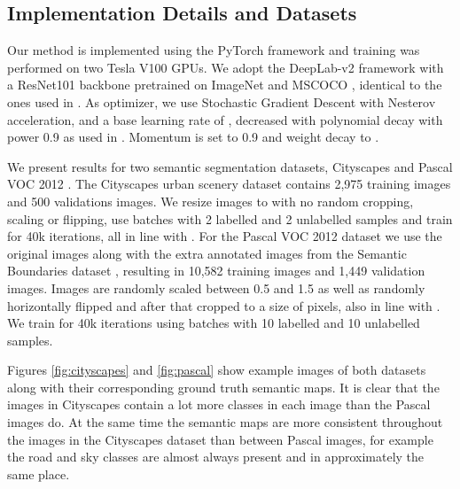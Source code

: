 \documentclass[10pt,twocolumn,letterpaper]{article}
\begin{document}
\subsection{Implementation Details and Datasets}
Our method is implemented using the PyTorch framework and training was performed on two Tesla V100 GPUs. We adopt the DeepLab-v2 framework \cite{DeepLabv2} with a ResNet101 backbone \cite{ResNet} pretrained on ImageNet \cite{imagenet} and MSCOCO \cite{mscoco}, identical to the ones used in \cite{Hung, Feng, Mittal}. 
As optimizer, we use Stochastic Gradient Descent with Nesterov acceleration, and a base learning rate of , decreased with polynomial decay with power 0.9 as used in \cite{DeepLabv2}. Momentum is set to 0.9 and weight decay to .

We present results for two semantic segmentation datasets, Cityscapes \cite{Cityscapes} and Pascal VOC 2012 \cite{pascal-voc-2012}. The Cityscapes urban scenery dataset contains 2,975 training images and 500 validations images. We resize images to  with no random cropping, scaling or flipping, use batches with 2 labelled and 2 unlabelled samples and train for 40k iterations, all in line with \cite{Hung}.
For the Pascal VOC 2012 dataset we use the original images along with the extra annotated images from the Semantic Boundaries dataset \cite{SemanticBoundaries}, resulting in 10,582 training images and 1,449 validation images. Images are randomly scaled between 0.5 and 1.5 as well as randomly horizontally flipped and after that cropped to a size of  pixels, also in line with \cite{Hung}. We train for 40k iterations using batches with 10 labelled and 10 unlabelled samples.

Figures \ref{fig:cityscapes} and \ref{fig:pascal} show example images of both datasets along with their corresponding ground truth semantic maps. It is clear that the images in Cityscapes contain a lot more classes in each image than the Pascal images do. At the same time the semantic maps are more consistent throughout the images in the Cityscapes dataset than between Pascal images, for example the road and sky classes are almost always present and in approximately the same place.
\end{document}
